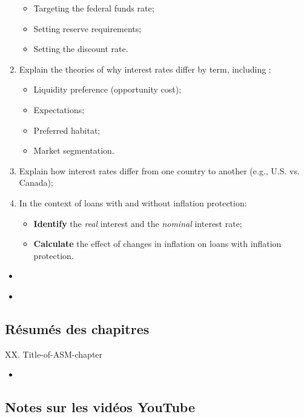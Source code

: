 \begin{outcomes}
\begin{enumerate}[label = \alph*)]
\begin{itemize}
		\item	Targeting the federal funds rate;
		\item	Setting reserve requirements;
		\item	Setting the discount rate.
		\end{itemize}
	\item	Explain the theories of why interest rates differ by term, including :
		\begin{itemize}
		\item	Liquidity preference (opportunity cost);
		\item	Expectations;
		\item	Preferred habitat; 
		\item	Market segmentation.
		\end{itemize}
	\item	Explain how interest rates differ from one country to another (e.g., U.S. vs. Canada);
	\item	In the context of loans with and without inflation protection:
		\begin{itemize}
		\item	\textbf{Identify} the \textit{real} interest and the \textit{nominal} interest rate;
		\item	\textbf{Calculate} the effect of changes in inflation on loans with inflation protection.
		\end{itemize}
\end{enumerate}
\end{outcomes}

\begin{ASM_chapter}
\begin{itemize}
	\item	{}
\end{itemize}
\end{ASM_chapter}

\begin{YTB_vids}
\begin{itemize}
	\item	
\end{itemize}
\end{YTB_vids}

\subsection{Résumés des chapitres}

\begin{CHPT_SUMM_AUTO}[label = {L.-XX}]{XX. Title-of-ASM-chapter}
	\begin{itemize}
		\item	
	\end{itemize}
\end{CHPT_SUMM_AUTO}

\subsection{Notes sur les vidéos YouTube}

